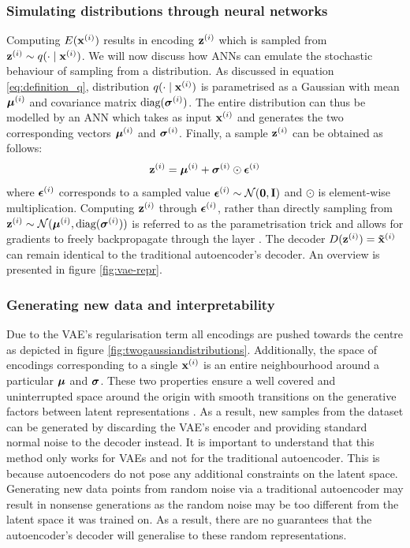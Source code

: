 \subsubsection{Simulating distributions through neural networks}
	Computing $E(\mathbf{x}^{(i)})$ results in encoding $\mathbf{z}^{(i)}$ which is sampled from $\mathbf{z}^{(i)} \sim q ( \cdot \mid \mathbf{x}^{(i)})$. We will now discuss how ANNs can emulate the stochastic behaviour of sampling from a distribution. As discussed in equation \ref{eq:definition_q}, distribution $q ( \cdot \mid \mathbf{x}^{(i)})$ is parametrised as a Gaussian with mean $\bm{\mu}^{(i)}$ and covariance matrix $\text{diag}(\bm{\sigma}^{(i)})$. The entire distribution can thus be modelled by an ANN which takes as input $\mathbf{x}^{(i)}$ and generates the two corresponding vectors $\bm{\mu}^{(i)}$ and $\bm{\sigma}^{(i)}$. Finally, a sample $\mathbf{z}^{(i)}$ can be obtained as follows:
	\begin{equation}
		\mathbf{z}^{(i)} = \bm{\mu}^{(i)} + \bm{\sigma}^{(i)} \odot \bm{\epsilon}^{(i)}
	\end{equation}
	where $\bm{\epsilon}^{(i)}$ corresponds to a sampled value $\bm{\epsilon}^{(i)} \sim \mathcal{N}(\bm{\mathbf{0}}, \mathbf{I})$ and $\odot$ is element-wise multiplication. Computing $\mathbf{z}^{(i)}$ through $\bm{\epsilon}^{(i)}$, rather than directly sampling from $\mathbf{z}^{(i)} \sim \mathcal{N}(\bm{\mu}^{(i)}, \text{diag}(\bm{\sigma}^{(i)}))$ is referred to as the parametrisation trick and allows for gradients to freely backpropagate through the layer \cite{davidfosterVariationalAutoencoders2023}. The decoder $D(\mathbf{z}^{(i)}) = \mathbf{\tilde{x}}^{(i)}$ can remain identical to the traditional autoencoder's decoder. An overview is presented in figure \ref{fig:vae-repr}.
	
	
	
	
	
	




	
	


\subsubsection{Generating new data and interpretability}	
	Due to the VAE's regularisation term all encodings are pushed towards the centre as depicted in figure \ref{fig:twogaussiandistributions}. Additionally, the space of encodings corresponding to a single $\mathbf{x}^{(i)}$ is an entire neighbourhood around a particular $\bm{\mu}$ and $\bm{\sigma}$. These two properties ensure a well covered and uninterrupted space around the origin with smooth transitions on the generative factors between latent representations \cite{davidfosterVariationalAutoencoders2023}. As a result, new samples from the dataset can be generated by discarding the VAE's encoder and providing standard normal noise to the decoder instead. It is important to understand that this method only works for VAEs and not for the traditional autoencoder. This is because autoencoders do not pose any additional constraints on the latent space. Generating new data points from random noise via a traditional autoencoder may result in nonsense generations as the random noise may be too different from the latent space it was trained on. As a result, there are no guarantees that the autoencoder's decoder will generalise to these random representations.
	
